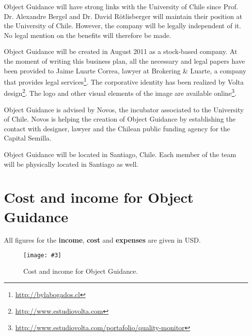 \documentclass[runningheads]{llncs}
\newcommand{\fig}[4]{
	\begin{figure}[#1]
		\centering
		\texttt{[image: \#3]}
		\caption{\label{fig:#3}#4}
	\end{figure}}
\begin{document}
Object Guidance will have strong links with the University of Chile since Prof. Dr. Alexandre Bergel and Dr. David R\"otlisberger will maintain their position at the University of Chile. However, the company will be legally independent of it. No legal mention on the benefits will therefore be made. 

Object Guidance will be created in August 2011 as a stock-based company. At the moment of writing this business plan, all the necessary and legal papers have been provided to Jaime Luarte Correa, lawyer at Brokering \& Luarte, a company that provides legal services\footnote{\url{http://bylabogados.cl}}. The corporative identity has been realized by Volta design\footnote{\url{http://www.estudiovolta.com}}. The logo and other visual elements of the image are available online\footnote{\url{http://www.estudiovolta.com/portafolio/quality-monitor}}.

Object Guidance is advised by Novos, the incubator associated to the University of Chile. Novos is helping the creation of Object Guidance by establishing the contact with designer, lawyer and the Chilean public funding agency for the Capital Semilla.

Object Guidance will be located in Santiago, Chile. Each member of the team will be physically located in Santiago as well.




\appendix
\section{Cost and income for Object Guidance}

All figures for the \textbf{income}, \textbf{cost} and \textbf{expenses} are given in USD.

\fig{}{1.3}{incomeSheet}{Cost and income for Object Guidance.}
\end{document}
